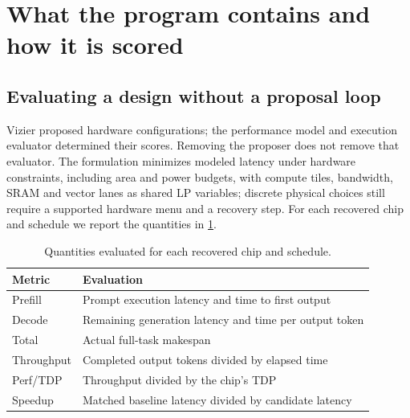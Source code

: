 \section{What the program contains and how it is scored}
\label{sec:program_contents}

\subsection{Evaluating a design without a proposal loop}
\label{sec:eval_without_vizier}

Vizier proposed hardware configurations; the performance model and execution
evaluator determined their scores. Removing the proposer does not remove that
evaluator. The formulation minimizes modeled latency under hardware
constraints, including area and power budgets, with compute tiles, bandwidth,
SRAM and vector lanes as shared LP variables; discrete physical choices still
require a supported hardware menu and a recovery step. For each recovered chip
and schedule we report the quantities in \cref{tab:eval_metrics}.

\begin{table}[t]
\centering
\small
\caption{Quantities evaluated for each recovered chip and schedule.}
\label{tab:eval_metrics}
\begin{tabularx}{\linewidth}{@{}lX@{}}
\toprule
\textbf{Metric} & \textbf{Evaluation} \\
\midrule
Prefill     & Prompt execution latency and time to first output \\
Decode      & Remaining generation latency and time per output token \\
Total       & Actual full-task makespan \\
Throughput  & Completed output tokens divided by elapsed time \\
Perf/TDP    & Throughput divided by the chip's TDP \\
Speedup     & Matched baseline latency divided by candidate latency \\
\bottomrule
\end{tabularx}
\end{table}

